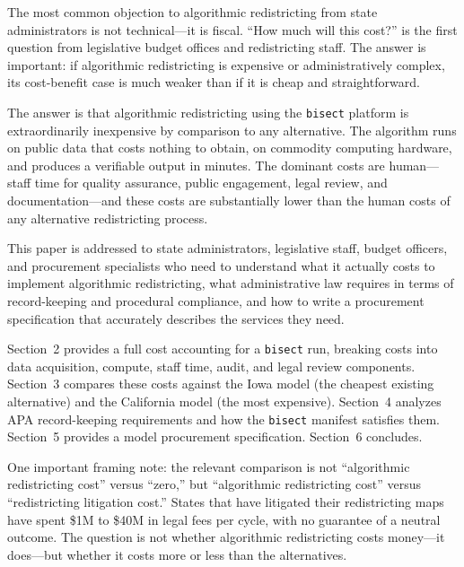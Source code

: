 The most common objection to algorithmic redistricting from state administrators is not technical---it is fiscal. ``How much will this cost?'' is the first question from legislative budget offices and redistricting staff. The answer is important: if algorithmic redistricting is expensive or administratively complex, its cost-benefit case is much weaker than if it is cheap and straightforward.

The answer is that algorithmic redistricting using the \texttt{bisect} platform is extraordinarily inexpensive by comparison to any alternative. The algorithm runs on public data that costs nothing to obtain, on commodity computing hardware, and produces a verifiable output in minutes. The dominant costs are human---staff time for quality assurance, public engagement, legal review, and documentation---and these costs are substantially lower than the human costs of any alternative redistricting process.

This paper is addressed to state administrators, legislative staff, budget officers, and procurement specialists who need to understand what it actually costs to implement algorithmic redistricting, what administrative law requires in terms of record-keeping and procedural compliance, and how to write a procurement specification that accurately describes the services they need.

Section~2 provides a full cost accounting for a \texttt{bisect} run, breaking costs into data acquisition, compute, staff time, audit, and legal review components. Section~3 compares these costs against the Iowa model (the cheapest existing alternative) and the California model (the most expensive). Section~4 analyzes APA record-keeping requirements and how the \texttt{bisect} manifest satisfies them. Section~5 provides a model procurement specification. Section~6 concludes.

One important framing note: the relevant comparison is not ``algorithmic redistricting cost'' versus ``zero,'' but ``algorithmic redistricting cost'' versus ``redistricting litigation cost.'' States that have litigated their redistricting maps have spent \$1M to \$40M in legal fees per cycle, with no guarantee of a neutral outcome. The question is not whether algorithmic redistricting costs money---it does---but whether it costs more or less than the alternatives.
